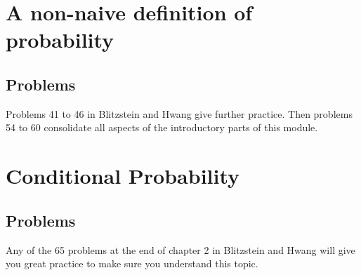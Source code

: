 \documentclass[12pt]{extbook}
\begin{document}
\chapter{A non-naive definition of probability}



\section{Problems}
\begin{enumerate}







\end{enumerate}


Problems 41 to 46 in Blitzstein and Hwang give further practice.   Then problems 54 to 60 consolidate all aspects of the introductory parts of this module.



\chapter{Conditional Probability}


\section{Problems}

\begin{enumerate}











\end{enumerate}

Any of the 65 problems at the end of chapter 2 in Blitzstein and Hwang will give you great practice to make sure you understand this topic.

\end{document}
